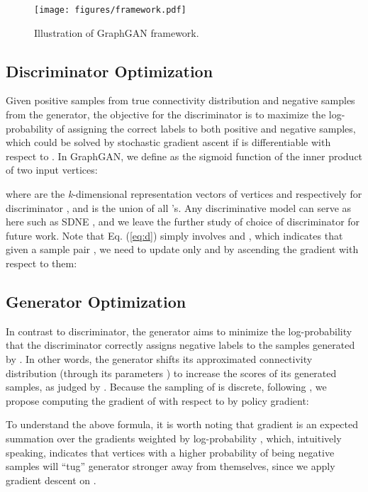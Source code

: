 \documentclass[letterpaper]{article}
\begin{document}
		\begin{figure}
			\centering
			\texttt{[image: figures/framework.pdf]}
			\caption{Illustration of GraphGAN framework.}
			\label{fig:framework}
		\end{figure}
	
	
	\subsection{Discriminator Optimization}
		Given positive samples from true connectivity distribution and negative samples from the generator, the objective for the discriminator is to maximize the log-probability of assigning the correct labels to both positive and negative samples, which could be solved by stochastic gradient ascent if  is differentiable with respect to .
		In GraphGAN, we define  as the sigmoid function of the inner product of two input vertices:
		
		where  are the \textit{k}-dimensional representation vectors of vertices  and  respectively for discriminator , and  is the union of all 's.
		Any discriminative model can serve as  here such as SDNE \cite{wang2016structural}, and we leave the further study of choice of discriminator for future work.
		Note that Eq. (\ref{eq:d}) simply involves  and , which indicates that given a sample pair , we need to update only  and  by ascending the gradient with respect to them:
		
	
	
	\subsection{Generator Optimization}
		In contrast to discriminator, the generator aims to minimize the log-probability that the discriminator correctly assigns negative labels to the samples generated by .
		In other words, the generator shifts its approximated connectivity distribution (through its parameters ) to increase the scores of its generated samples, as judged by .
		Because the sampling of  is discrete, following \cite{schulman2015gradient,yu2017seqgan}, we propose computing the gradient of  with respect to  by policy gradient:
		
		To understand the above formula, it is worth noting that gradient  is an expected summation over the gradients  weighted by log-probability , which, intuitively speaking, indicates that vertices with a higher probability of being negative samples will ``tug'' generator  stronger away from themselves, since we apply gradient descent on .
	
\end{document}
